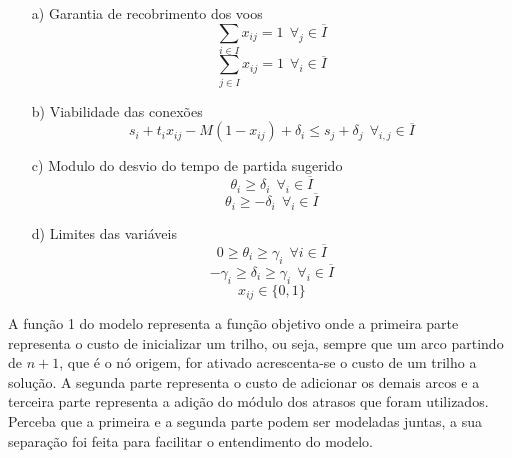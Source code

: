 \begin{enumerate}


\item[a)] Garantia de recobrimento dos voos \\
\begin{equation}
  \sum_{i \in I} x_{ij}= 1 \   \ \forall_{j} \in \overline{I} 
\end{equation}
\begin{equation}
\sum_{j \in I} x_{ij} = 1 \   \ \forall_{i} \in \overline{I}
\end{equation}


\item[b)] Viabilidade das conexões \\
\begin{equation}
s_{i} + t_{i}x_{ij} - M(1 - x_{ij}) + \delta_{i} \leq s_{j} + \delta_{j} \   \ \forall_{i,j} \in \overline{I}
\end{equation}

\item[c)] Modulo do desvio do tempo de partida sugerido \\
\begin{equation}
\theta_{i} \geq \delta_{i} \   \ \forall_{i} \in \overline{I}
\end{equation}
\begin{equation}
\theta_{i} \geq -\delta_{i} \   \ \forall_{i} \in \overline{I}
\end{equation}

\item[d)] Limites das variáveis \\
\begin{equation}
0 \geq \theta_{i} \geq \gamma_{i} \   \ \forall{i} \in \overline{I}
\end{equation}
\begin{equation}
-\gamma_{i} \geq \delta_{i} \geq \gamma_{i} \   \ \forall_{i} \in \overline{I}
\end{equation}
\begin{equation}
x_{ij} \in \{0,1\}
\end{equation}
\end{enumerate}

\clearpage

A função 1 do modelo representa a função objetivo onde a primeira parte
representa o custo de inicializar um trilho, ou seja, sempre que um arco
partindo de $n+1$, que é o nó origem, for ativado acrescenta-se o custo de um
trilho a solução. A segunda parte representa o custo de adicionar os demais
arcos e a terceira parte representa a adição do módulo dos atrasos que foram
utilizados. Perceba que a primeira e a segunda parte podem ser modeladas juntas,
a sua separação foi feita para facilitar o entendimento do modelo.

